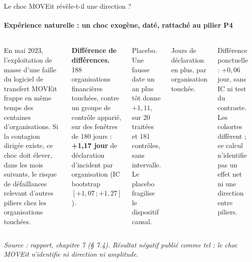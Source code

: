 \documentclass[aspectratio=169,10pt,t]{beamer}
\newcommand{\source}[1]{\par\vfill{\tiny\color{gris}\textit{Source : #1}}\par\vspace{-1mm}}
\begin{document}
\begin{frame}{Le choc MOVEit révèle-t-il une direction ?}
  \suivimethode{}{}
  \framesubtitle{\ajout Expérience naturelle : un choc exogène, daté, rattaché au pilier P4}
  \begin{columns}[T,onlytextwidth]
    \footnotesize
    En mai 2023, l'exploitation de masse d'une faille du logiciel de transfert MOVEit frappe en même temps des centaines d'organisations. Si la contagion dirigée existe, ce choc doit élever, dans les mois suivants, le risque de défaillances relevant d'autres piliers chez les organisations touchées.\par\vspace{2mm}
    \textbf{Différence de différences.} 188 organisations financières touchées, contre un groupe de contrôle apparié, sur des fenêtres de 180 jours : \textbf{+1,17 jour} de déclaration d'incident par organisation (IC bootstrap $[+1{,}07\,;+1{,}27]$).\par\vspace{2mm}
    {\color{accent}Placebo.} Une fausse date un an plus tôt donne $+1{,}11$, sur 20 traitées et 181 contrôles, sans intervalle. Le placebo fragilise le dispositif causal.
    \centering
    \par\vspace{1mm}
    {\scriptsize Jours de déclaration en plus, par organisation touchée.\par}\vspace{2mm}
    \footnotesize\raggedright Différence ponctuelle : $+0{,}06$ jour, sans IC ni test du contraste. Les cohortes diffèrent ; ce calcul n'identifie pas un effet net ni une direction entre piliers.
  \end{columns}
  \source{rapport, chapitre 7 (§ 7.4). Résultat négatif publié comme tel ; le choc MOVEit n'identifie ni direction ni amplitude.}
\end{frame}
\end{document}
